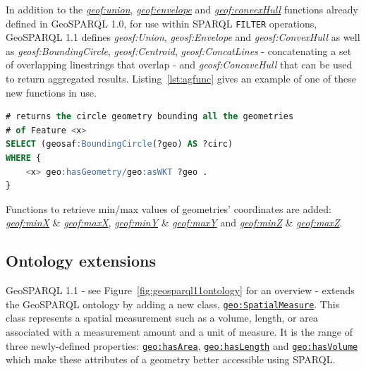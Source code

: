 \documentclass[runningheads]{llncs}
\begin{document}
In addition to the \href{http://www.opengis.net/def/function/geosparql/union}{\emph{geof:union}}, \href{http://www.opengis.net/def/function/geosparql/envelope}{\emph{geof:envelope}} and \href{http://www.opengis.net/def/function/geosparql/convexHull}{\emph{geof:convexHull}} functions already defined in GeoSPARQL 1.0, 
for use within SPARQL \texttt{FILTER} operations, GeoSPARQL 1.1 defines \emph{geosf:Union}, \emph{geosf:Envelope} and \emph{geosf:ConvexHull}
as well as \emph{geosf:BoundingCircle}, \emph{geosf:Centroid}, \emph{geosf:ConcatLines} - concatenating a set of overlapping linestrings 
that overlap - and \emph{geosf:ConcaveHull} that can be used to return aggregated results. Listing~\ref{lst:agfunc} gives an example 
of one of these new functions in use.
\small
\begin{lstlisting}[caption=Aggregation Function example SPARQL query,label=lst:agfunc,language=sql,frame=single,basicstyle=\ttfamily,showstringspaces=false]
# returns the circle geometry bounding all the geometries 
# of Feature <x>
SELECT (geosaf:BoundingCircle(?geo) AS ?circ)
WHERE {
    <x> geo:hasGeometry/geo:asWKT ?geo .
}
\end{lstlisting}
\normalsize

Functions to retrieve min/max values of geometries' coordinates are added: \href{http://www.opengis.net/def/function/geosparql/minX}{\emph{geof:minX}} \& \href{http://www.opengis.net/def/function/geosparql/maxX}{\emph{geof:maxX}},
\href{http://www.opengis.net/def/function/geosparql/minY}{\emph{geof:minY}} \& \href{http://www.opengis.net/def/function/geosparql/maxY}{\emph{geof:maxY}} and \href{http://www.opengis.net/def/function/geosparql/minZ}{\emph{geof:minZ}} \& \href{http://www.opengis.net/def/function/geosparql/maxZ}{\emph{geof:maxZ}}.

\subsection{Ontology extensions}\label{sec:ontexts}
GeoSPARQL 1.1 - see Figure~\ref{fig:geosparql11ontology} for an overview - extends the GeoSPARQL ontology by adding a new class, \href{http://www.opengis.net/ont/geosparql#SpatialMeasure}{\texttt{geo:SpatialMeasure}}. This class represents a spatial measurement 
such as a volume, length, or area associated with a measurement amount and a unit of measure. It is the range of three newly-defined properties:
\href{http://www.opengis.net/ont/geosparql#hasArea}{\texttt{geo:hasArea}}, \href{http://www.opengis.net/ont/geosparql#hasLength}{\texttt{geo:hasLength}} and \href{http://www.opengis.net/ont/geosparql#hasVolume}{\texttt{geo:hasVolume}} which make these attributes of a geometry better accessible using 
SPARQL. 
\end{document}
